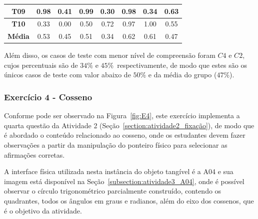 \begin{table}[htbp]
\begin{tabular}{|c|cccccc|c|}
		\textbf{T09} & \multicolumn{1}{c|}{0.98} & \multicolumn{1}{c|}{0.41} & \multicolumn{1}{c|}{0.99} & \multicolumn{1}{c|}{0.30} & \multicolumn{1}{c|}{0.98} & 0.34 & 0.63 \\ \hline
		\rowcolor[HTML]{D9D9D9} 
		\textbf{T10} & \multicolumn{1}{c|}{\cellcolor[HTML]{D9D9D9}0.33} & \multicolumn{1}{c|}{\cellcolor[HTML]{D9D9D9}0.00} & \multicolumn{1}{c|}{\cellcolor[HTML]{D9D9D9}0.50} & \multicolumn{1}{c|}{\cellcolor[HTML]{D9D9D9}0.72} & \multicolumn{1}{c|}{\cellcolor[HTML]{D9D9D9}0.97} & 1.00 & 0.55 \\ \hline
		\textbf{Média} & \multicolumn{1}{c|}{0.53} & \multicolumn{1}{c|}{0.45} & \multicolumn{1}{c|}{0.51} & \multicolumn{1}{c|}{0.34} & \multicolumn{1}{c|}{0.62} & 0.61 & 0.47 \\ \hline
	\end{tabular}
	\label{tab:F3_A3_NCQ}
\end{table}

Além disso, os casos de teste com menor nível de compreensão foram $C4$ e $C2$, cujos percentuais são de $34\%$ e $45\%$\ respectivamente, de modo que estes são os únicos casos de teste com valor abaixo de $50\%$ e da média do grupo ($47\%$).%


\subsubsection{Exercício 4 - Cosseno}\label{subsubsec:F3A4}

Conforme pode ser observado na Figura~\ref{fig:E4}, este exercício implementa a quarta questão da Atividade 2 (Seção~\ref{section:atividade2_fixação}), de modo que é abordado o conteúdo relacionado ao cosseno, onde os estudantes devem fazer observações a partir da manipulação do ponteiro físico para selecionar as afirmações corretas. 

A interface física utilizada nesta instância do objeto tangível é a A04 e sua imagem está disponível na Seção~\ref{subsection:atividade3_A04}, onde é possível observar o círculo trigonométrico parcialmente construído, contendo os quadrantes, todos os ângulos em graus e radianos, além do eixo dos cossenos, que é o objetivo da atividade.

